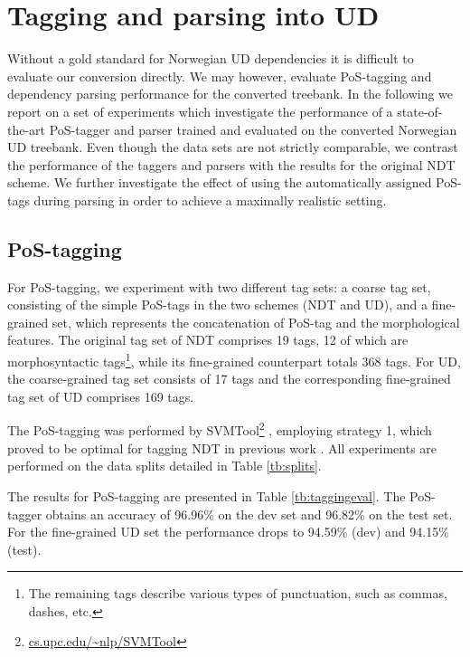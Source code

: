 \documentclass[10pt, a4paper]{article}
\begin{document}



\section{Tagging and parsing into UD}
Without a gold standard for Norwegian UD dependencies it is difficult
to evaluate our conversion directly. We may however, evaluate
PoS-tagging and dependency parsing performance for the converted
treebank.  In the following we report on a set of experiments which
investigate the performance of a state-of-the-art PoS-tagger and
parser trained and evaluated on the converted Norwegian UD
treebank. Even though the data sets are not strictly comparable, we
contrast the performance of the taggers and parsers with the results
for the original NDT scheme. We further investigate the effect of
using the automatically assigned PoS-tags during parsing in order to
achieve a maximally realistic setting.

\subsection{PoS-tagging}
For PoS-tagging, we experiment with two different tag sets: a coarse
tag set, consisting of the simple PoS-tags in the two schemes (NDT and
UD), and a fine-grained set, which represents the concatenation of
PoS-tag and the morphological features. The original tag set of NDT
comprises 19 tags, 12 of which are morphosyntactic tags\footnote{The
  remaining tags describe various types of punctuation, such as
  commas, dashes, etc.}, while its fine-grained counterpart totals 368
tags. For UD, the coarse-grained tag set consists of 17 tags and the
corresponding fine-grained tag set of UD comprises 169 tags.

The PoS-tagging was performed by
SVMTool\footnote{\url{cs.upc.edu/~nlp/SVMTool}} \cite{Gim:Mar:04},
employing strategy 1, which proved to be optimal for tagging NDT in
previous work \cite{Hohle:16}. All experiments are performed on the
data splits detailed in Table \ref{tb:splits}.

The results for PoS-tagging are presented in Table
\ref{tb:taggingeval}. The PoS-tagger obtains an accuracy of 96.96\% on
the dev set and 96.82\% on the test set. For the fine-grained UD set
the performance drops to 94.59\% (dev) and 94.15\% (test).
\end{document}
